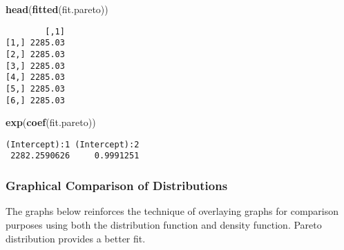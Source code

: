 \documentclass[]{book}
\newenvironment{Shaded}{\begin{snugshade}}{\end{snugshade}}
\newcommand{\KeywordTok}[1]{\textcolor[rgb]{0.13,0.29,0.53}{\textbf{#1}}}
\newcommand{\NormalTok}[1]{#1}
\theoremstyle{definition}
\theoremstyle{definition}
\theoremstyle{definition}
\theoremstyle{remark}
\begin{document}
\begin{Shaded}
\begin{Highlighting}[]
\KeywordTok{head}\NormalTok{(}\KeywordTok{fitted}\NormalTok{(fit.pareto))}
\end{Highlighting}
\end{Shaded}

\begin{verbatim}
        [,1]
[1,] 2285.03
[2,] 2285.03
[3,] 2285.03
[4,] 2285.03
[5,] 2285.03
[6,] 2285.03
\end{verbatim}

\begin{Shaded}
\begin{Highlighting}[]
\KeywordTok{exp}\NormalTok{(}\KeywordTok{coef}\NormalTok{(fit.pareto))}
\end{Highlighting}
\end{Shaded}

\begin{verbatim}
(Intercept):1 (Intercept):2 
 2282.2590626     0.9991251 
\end{verbatim}

\subsubsection{Graphical Comparison of
Distributions}\label{graphical-comparison-of-distributions}

The graphs below reinforces the technique of overlaying graphs for
comparison purposes using both the distribution function and density
function. Pareto distribution provides a better fit.
\end{document}
